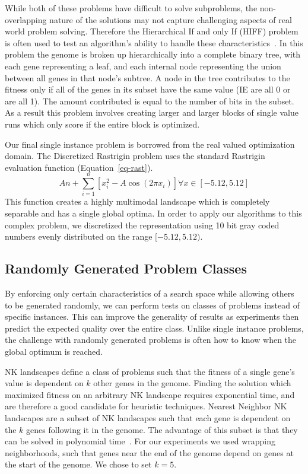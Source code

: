 \documentclass{sig-alternate}
\begin{document}
While both of these problems have difficult to solve subproblems, the non-overlapping
nature of the solutions may not capture challenging aspects of real world problem solving.
Therefore the Hierarchical If and only If (HIFF) problem is often used to test an
algorithm's ability to handle these characteristics~\cite{thierens:2013:ltgahiff}.
In this problem the genome is broken up hierarchically into a complete binary tree,
with each gene representing a leaf, and each internal node representing the union
between all genes in that node's subtree.  A node in the tree contributes to the fitness
only if all of the genes in its subset have the same value (IE are all 0 or are all 1).
The amount contributed is equal to the number of bits in the subset.  As a result
this problem involves creating larger and larger blocks of single value runs which
only score if the entire block is optimized.

Our final single instance problem is borrowed from the real valued optimization domain.
The Discretized Rastrigin problem uses the standard Rastrigin evaluation function (Equation~\ref{eq-rast}).
\begin{equation}
  An + \sum_{i=1}^{n}\left [ x_i^2-A\cos (2\pi x_i) \right ] \forall x\in [-5.12,5.12]
  \label{eq-rast}
\end{equation}
This function creates a highly multimodal landscape which is completely separable
and has a single global optima.  In order to apply our algorithms to this complex problem,
we discretized the representation using 10 bit gray coded numbers evenly distributed
on the range $[-5.12,5.12)$.

\subsection{Randomly Generated Problem Classes}
By enforcing only certain characteristics of a search space while allowing others
to be generated randomly, we can perform tests on classes of problems instead
of specific instances.  This can improve the generality of results as experiments
then predict the expected quality over the entire class.  Unlike single
instance problems, the challenge with randomly generated problems is often how
to know when the global optimum is reached.

NK landscapes define a class of problems such that the fitness of a single gene's
value is dependent on $k$ other genes in the genome.  Finding the solution which
maximized fitness on an arbitrary NK landscape requires exponential time, and
are therefore a good candidate for heuristic techniques.  Nearest Neighbor NK
landscapes are a subset of NK landscapes such that each gene is dependent on the $k$
genes following it in the genome.  The advantage of this subset is that they can be
solved in polynomial time~\cite{wright:2000:solvingnk}.  For our experiments we
used wrapping neighborhoods, such that genes near the end of the genome depend on
genes at the start of the genome.  We chose to set $k=5$.
\end{document}

